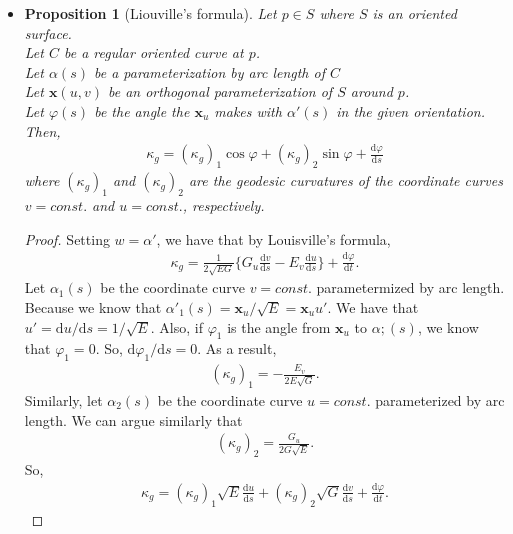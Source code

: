 \documentclass[10pt]{article}
\newtheorem{proposition}[lemma]{Proposition}
\newcommand{\dee}{\mathrm{d}}
\newcommand{\ve}[1]{\mathbf{#1}}
\begin{document}
\begin{itemize}
    \item \begin{proposition}[Liouville's formula] \label{louisville-formula}
      Let $p \in S$ where $S$ is an oriented surface.\\
      Let $C$ be a regular oriented curve at $p$.\\
      Let $\alpha(s)$ be a parameterization by arc length of $C$\\
      Let $\ve{x}(u,v)$ be an orthogonal parameterization of $S$ around $p$.\\
      Let $\varphi(s)$ be the angle the $\ve{x}_u$ makes with $\alpha'(s)$ in the given orientation.
      Then,
      \begin{align*}
        \kappa_g = (\kappa_g)_1 \cos \varphi + (\kappa_g)_2 \sin \varphi + \frac{\dee \varphi}{\dee s}
      \end{align*}
      where $(\kappa_g)_1$ and $(\kappa_g)_2$ are the geodesic curvatures of the coordinate curves $v = const.$ and $u = const.$, respectively.
    \end{proposition}
    \begin{proof}
      Setting $w = \alpha'$, we have that by Louisville's formula,
      \begin{align*}
        \kappa_g = \frac{1}{2\sqrt{EG}} \bigg\{ G_u \frac{\dee v}{\dee s} - E_v \frac{\dee u}{\dee s} \bigg\} + \frac{\dee \varphi}{\dee t}.
      \end{align*}
      Let $\alpha_1(s)$ be the coordinate curve $v = const.$ parametermized by arc length. Because we know that $\alpha'_1(s) = \ve{x}_u / \sqrt{E} = \ve{x}_u u'.$ We have that $u' = \dee u / \dee s = 1 / \sqrt{E}$. Also, if $\varphi_1$ is the angle from $\ve{x}_u$ to $\alpha;(s)$, we know that $\varphi_1 = 0$. So, $\dee \varphi_1 / \dee s = 0$. As a result,
      \begin{align*}
        (\kappa_g)_1 = - \frac{E_v}{2 E \sqrt{G}}.
      \end{align*}
      Similarly, let $\alpha_2(s)$ be the coordinate curve $u = const.$ parameterized by arc length. We can argue similarly that
      \begin{align*}
        (\kappa_g)_2 = \frac{G_u}{2 G \sqrt{E}}.
      \end{align*}
      So,
      \begin{align*}
        \kappa_g = (\kappa_g)_1 \sqrt{E} \frac{\dee u}{\dee s} + (\kappa_g)_2 \sqrt{G} \frac{\dee v}{\dee s} + \frac{\dee \varphi}{\dee t}.
      \end{align*}

\end{proof}
\end{itemize}
\end{document}
